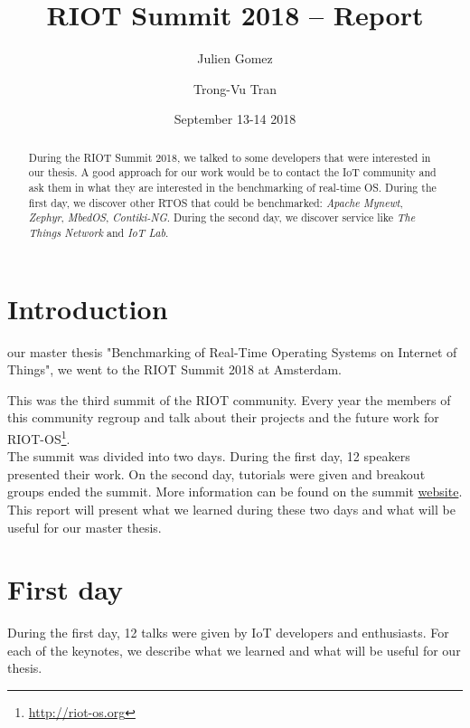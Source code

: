 \documentclass[journal, a4paper]{../IEEEtran}
\begin{document}
\title{RIOT Summit 2018 -- Report}
\author{Julien Gomez \and Trong-Vu Tran}
\date{September 13-14 2018}
\maketitle

\begin{abstract}
	During the RIOT Summit 2018, we talked to some developers that were interested in our thesis. 
    A good approach for our work would be to contact the IoT community and ask them in what they are interested in the benchmarking of real-time OS. 
    During the first day, we discover other RTOS that could be benchmarked: \textit{Apache Mynewt}, \textit{Zephyr}, \textit{MbedOS}, \textit{Contiki-NG}. 
    During the second day, we discover service like \textit{The Things Network} and \textit{IoT Lab}.
\end{abstract}

\section{Introduction}
 our master thesis "Benchmarking of Real-Time Operating Systems on Internet of Things", we went to the RIOT Summit 2018 at Amsterdam.
    
This was the third summit of the RIOT community. 
Every year the members of this community regroup and talk about their projects and the future work for RIOT-OS\footnote{\url{http://riot-os.org}}. \\

The summit was divided into two days. 
During the first day, 12 speakers presented their work. On the second day, tutorials were given and breakout groups ended the summit. 
More information can be found on the summit \href{http://summit.riot-os.org/2018/}{website}. \\

This report will present what we learned during these two days and what will be useful for our master thesis.

\section{First day}
During the first day, 12 talks were given by IoT developers and enthusiasts.
For each of the keynotes, we describe what we learned and what will be useful for our thesis.
\end{document}
